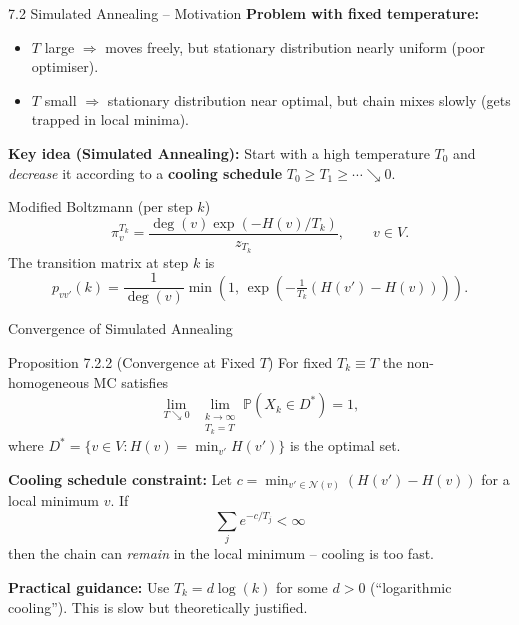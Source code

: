\documentclass[aspectratio=169,10pt]{beamer}
\newcommand{\Prob}{\mathbb{P}}
\begin{document}
\begin{frame}{7.2 Simulated Annealing -- Motivation}
  \textbf{Problem with fixed temperature:}
  \begin{itemize}
    \item $T$ large $\Rightarrow$ moves freely, but stationary distribution
      nearly uniform (poor optimiser).
    \item $T$ small $\Rightarrow$ stationary distribution near optimal, but
      chain mixes slowly (gets trapped in local minima).
  \end{itemize}

  \textbf{Key idea (Simulated Annealing):}
  Start with a high temperature $T_0$ and \emph{decrease} it according to
  a \textbf{cooling schedule} $T_0 \ge T_1 \ge \cdots \searrow 0$.

  \begin{block}{Modified Boltzmann (per step $k$)}
    \[
      \pi^{T_k}_v = \frac{\deg(v)\exp(-H(v)/T_k)}{z_{T_k}}, \qquad v \in V.
    \]
    The transition matrix at step $k$ is
    \[
      p_{vv'}(k) = \frac{1}{\deg(v)}\min\!\left(1,\,
        \exp\!\left(-\tfrac{1}{T_k}(H(v')-H(v))\right)\right).
    \]
  \end{block}
\end{frame}

\begin{frame}{Convergence of Simulated Annealing}
  \begin{block}{Proposition 7.2.2 (Convergence at Fixed $T$)}
    For fixed $T_k \equiv T$ the non-homogeneous MC satisfies
    \[
      \lim_{T \searrow 0}\; \lim_{\substack{k\to\infty \\ T_k=T}}
      \Prob(X_k \in D^*) = 1,
    \]
    where $D^* = \{v \in V : H(v) = \min_{v'} H(v')\}$ is the optimal set.
  \end{block}

  \textbf{Cooling schedule constraint:} Let $c = \min_{v' \in \mathcal{N}(v)}(H(v')-H(v))$
  for a local minimum $v$. If
  \[
    \sum_j e^{-c/T_j} < \infty
  \]
  then the chain can \emph{remain} in the local minimum -- cooling is too fast.

  \medskip
  \textbf{Practical guidance:}
  Use $T_k = d\log(k)$ for some $d > 0$ (``logarithmic cooling'').
  This is slow but theoretically justified.
\end{frame}
\end{document}
